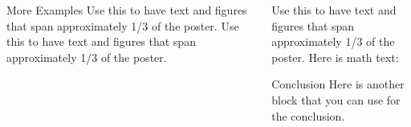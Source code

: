 \documentclass{beamer}
\begin{document}
\begin{frame}[t]
\begin{columns}[t]
\begin{column}{0.60\paperwidth}
\begin{columns}[t,totalwidth=0.60\paperwidth]
\begin{column}{0.28\paperwidth}
   \begin{block}{More Examples}
    Use this to have text and figures that
    span approximately 1/3 of the poster.
    Use this to have text and figures that
    span approximately 1/3 of the poster.
   \end{block}
 \end{column}


 \begin{column}{0.28\paperwidth}
   Use this to have text and figures that
   span approximately 1/3 of the poster.
   Here is math text:


 \begin{alertblock}{Conclusion}
   Here is another block that you can use for the conclusion.
 \end{alertblock}

 \end{column}
\end{columns}
\end{column}

\end{columns}



\end{frame}
\end{document}
